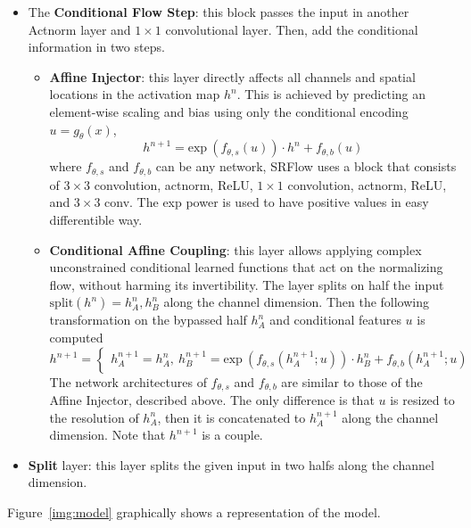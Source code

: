 \documentclass{article}
\begin{document}
\begin{itemize}
    \item The \textbf{Conditional Flow Step}: this block passes the input in another Actnorm layer and $1 \times 1$ convolutional layer. Then, add the conditional information in two steps.
        \begin{itemize}
            \item \textbf{Affine Injector}: this layer directly affects all channels and spatial locations in the activation map $h^n$. This is achieved by predicting an element-wise scaling and bias using only the conditional encoding $u = g_{\theta}(x)$,
            \begin{equation}
                h^{n+1} = \text{exp}\:(f_{\theta, s}(u)) \cdot h^n + f_{\theta, b}(u)
            \end{equation}
            where $f_{\theta, s}$ and $f_{\theta, b}$ can be any network, SRFlow uses a block that consists of $3 \times 3$ convolution, actnorm, ReLU, $1 \times 1$ convolution, actnorm, ReLU, and $3 \times 3$ conv. The exp power is used to have positive values in easy differentible way.

            \item \textbf{Conditional Affine Coupling}: this layer allows applying complex unconstrained conditional learned functions that act on the normalizing flow, without harming its invertibility. The layer splits on half the input $\text{split}(h^{n})= h^{n}_A, h^{n}_B$ along the channel dimension. Then the following transformation on the bypassed half $h^n_A$ and conditional features $u$ is computed
            \begin{equation}
                h^{n+1} = \begin{cases}
                    h^{n+1}_A = h^{n}_A, \:
                    h^{n+1}_B = \text{exp}\:(f_{\theta, s}( h^{n+1}_A; u)) \cdot h^n_B + f_{\theta, b}( h^{n+1}_A; u)
                \end{cases}
            \end{equation}  
            The network architectures of $f_{\theta, s}$ and $f_{\theta, b}$ are similar to those of the Affine Injector, described above. The only difference is that $u$ is resized to the resolution of $h^{n}_A$, then it is concatenated to $h^{n+1}_A$ along the channel dimension. Note that $h^{n+1}$ is a couple.
        \end{itemize}
    \item \textbf{Split} layer: this layer splits the given input in two halfs along the channel dimension. %
    \end{itemize}
\noindent Figure~\ref{img:model} graphically shows a representation of the model.
\end{document}
